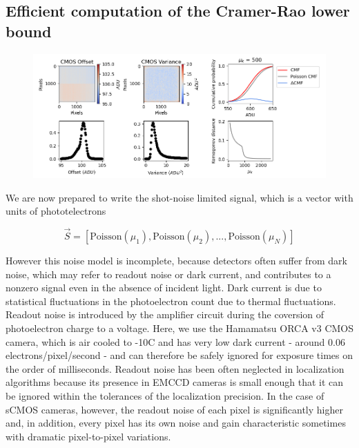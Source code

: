\documentclass{ucetd}
\begin{document}
\subsection{Efficient computation of the Cramer-Rao lower bound}


\begin{figure}
\begin{center}
\includegraphics[width=16cm]{Noise.png}
\end{center}
\end{figure}


We are now prepared to write the shot-noise limited signal, which is a vector with units of phototelectrons

\begin{equation}
\vec{S} = \left[\mathrm{Poisson}(\mu_{1}), \mathrm{Poisson}(\mu_{2}), ..., \mathrm{Poisson}(\mu_{N})\right]
\end{equation}


However this noise model is incomplete, because detectors often suffer from dark noise, which may refer to readout noise or dark current, and contributes to a nonzero signal even in the absence of incident light. Dark current is due to statistical fluctuations in the photoelectron count due to thermal fluctuations. Readout noise is introduced by the amplifier circuit during the coversion of photoelectron charge to a voltage. Here, we use the Hamamatsu ORCA v3 CMOS camera, which is air cooled to -10C and has very low dark current - around 0.06 electrons/pixel/second - and can therefore be safely ignored for exposure times on the order of milliseconds. Readout noise has been often neglected in localization algorithms because its presence in EMCCD cameras is small enough that it can be ignored within the tolerances of the localization precision. In the case of sCMOS cameras, however, the readout noise of each pixel is significantly higher and, in addition, every pixel has its own noise and gain characteristic sometimes with dramatic pixel-to-pixel variations.
\end{document}

